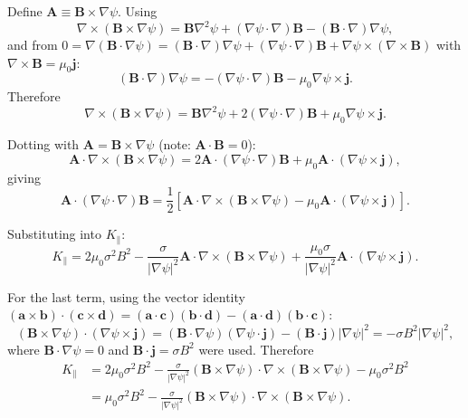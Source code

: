 \documentclass[10pt,a4paper]{article}
\numberwithin{equation}{section}
\begin{document}
Define $\mathbf A \equiv \mathbf B\times\nabla\psi$. Using
\begin{equation}
\nabla\times(\mathbf B\times\nabla\psi) = \mathbf B\nabla^2\psi + (\nabla\psi\cdot\nabla)\mathbf B - (\mathbf B\cdot\nabla)\nabla\psi,
\end{equation}
and from $0=\nabla(\mathbf B\cdot\nabla\psi) = (\mathbf B\cdot\nabla)\nabla\psi + (\nabla\psi\cdot\nabla)\mathbf B + \nabla\psi\times(\nabla\times\mathbf B)$ with $\nabla\times\mathbf B=\mu_0\mathbf j$:
\begin{equation}
(\mathbf B\cdot\nabla)\nabla\psi = -(\nabla\psi\cdot\nabla)\mathbf B - \mu_0\nabla\psi\times\mathbf j.
\end{equation}
Therefore
\begin{equation}
\nabla\times(\mathbf B\times\nabla\psi) = \mathbf B\nabla^2\psi + 2(\nabla\psi\cdot\nabla)\mathbf B + \mu_0\nabla\psi\times\mathbf j.
\end{equation}

Dotting with $\mathbf A=\mathbf B\times\nabla\psi$ (note: $\mathbf A\cdot\mathbf B=0$):
\begin{equation}
\mathbf A\cdot\nabla\times(\mathbf B\times\nabla\psi) = 2\mathbf A\cdot(\nabla\psi\cdot\nabla)\mathbf B + \mu_0\mathbf A\cdot(\nabla\psi\times\mathbf j),
\end{equation}
giving
\begin{equation}
\mathbf A\cdot(\nabla\psi\cdot\nabla)\mathbf B = \frac{1}{2}\left[\mathbf A\cdot\nabla\times(\mathbf B\times\nabla\psi) - \mu_0\mathbf A\cdot(\nabla\psi\times\mathbf j)\right].
\end{equation}

Substituting into $K_{\parallel}$:
\begin{equation}
K_{\parallel} = 2\mu_0\sigma^2B^2 - \frac{\sigma}{|\nabla\psi|^2}\mathbf A\cdot\nabla\times(\mathbf B\times\nabla\psi) + \frac{\mu_0\sigma}{|\nabla\psi|^2}\mathbf A\cdot(\nabla\psi\times\mathbf j).
\end{equation}

For the last term, using the vector identity $(\mathbf a\times\mathbf b)\cdot(\mathbf c\times\mathbf d) = (\mathbf a\cdot\mathbf c)(\mathbf b\cdot\mathbf d) - (\mathbf a\cdot\mathbf d)(\mathbf b\cdot\mathbf c)$:
\begin{equation}
(\mathbf B\times\nabla\psi)\cdot(\nabla\psi\times\mathbf j) = (\mathbf B\cdot\nabla\psi)(\nabla\psi\cdot\mathbf j) - (\mathbf B\cdot\mathbf j)|\nabla\psi|^2 = -\sigma B^2|\nabla\psi|^2,
\end{equation}
where $\mathbf B\cdot\nabla\psi=0$ and $\mathbf B\cdot\mathbf j=\sigma B^2$ were used. Therefore
\begin{align}
K_{\parallel} &= 2\mu_0\sigma^2B^2 - \frac{\sigma}{|\nabla\psi|^2}(\mathbf B\times\nabla\psi)\cdot\nabla\times(\mathbf B\times\nabla\psi) - \mu_0\sigma^2B^2 \\
&= \mu_0\sigma^2B^2 - \frac{\sigma}{|\nabla\psi|^2}(\mathbf B\times\nabla\psi)\cdot\nabla\times(\mathbf B\times\nabla\psi).
\end{align}
\end{document}
